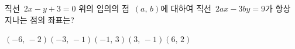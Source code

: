 직선~$2x-y+3=0$ 위의 임의의 점~$(a,\,b)$에 대하여 직선~$2ax-3by=9$가 항상 지나는 점의 좌표는?
\begin{choices32}{$(-6,\,-2)$}{$(-3,\,-1)$}{$(-1,\,3)$}{$(3,\,-1)$}{$(6,\,2)$}\end{choices32}
